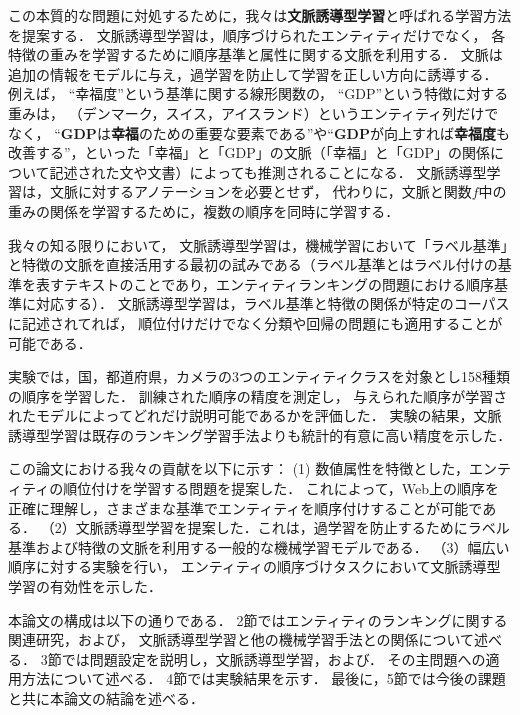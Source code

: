 この本質的な問題に対処するために，我々は{\bf 文脈誘導型学習}と呼ばれる学習方法を提案する．
文脈誘導型学習は，順序づけられたエンティティだけでなく，
各特徴の重みを学習するために順序基準と属性に関する文脈を利用する．
文脈は追加の情報をモデルに与え，過学習を防止して学習を正しい方向に誘導する．
例えば， ``幸福度''という基準に関する線形関数の， ``GDP''という特徴に対する重みは，
（デンマーク，スイス，アイスランド）というエンティティ列だけでなく，
 ``{\bf GDP}は{\bf 幸福}のための重要な要素である''や``{\bf GDP}が向上すれば{\bf 幸福度}も改善する''，といった「幸福」と「GDP」の文脈（「幸福」と「GDP」の関係について記述された文や文書）によっても推測されることになる．
文脈誘導型学習は，文脈に対するアノテーションを必要とせず， 
代わりに，文脈と関数$f$中の重みの関係を学習するために，複数の順序を同時に学習する．
 
我々の知る限りにおいて，
文脈誘導型学習は，機械学習において「ラベル基準」と特徴の文脈を直接活用する最初の試みである（ラベル基準とはラベル付けの基準を表すテキストのことであり，エンティティランキングの問題における順序基準に対応する）．
文脈誘導型学習は，ラベル基準と特徴の関係が特定のコーパスに記述されてれば，
順位付けだけでなく分類や回帰の問題にも適用することが可能である．

実験では，国，都道府県，カメラの3つのエンティティクラスを対象とし158種類の順序を学習した．
訓練された順序の精度を測定し，
与えられた順序が学習されたモデルによってどれだけ説明可能であるかを評価した．
実験の結果，文脈誘導型学習は既存のランキング学習手法よりも統計的有意に高い精度を示した．

この論文における我々の貢献を以下に示す：
(1) 数値属性を特徴とした，エンティティの順位付けを学習する問題を提案した．
これによって，Web上の順序を正確に理解し，さまざまな基準でエンティティを順序付けすることが可能である．
（2）文脈誘導型学習を提案した．これは，過学習を防止するためにラベル基準および特徴の文脈を利用する一般的な機械学習モデルである．
（3）幅広い順序に対する実験を行い，
エンティティの順序づけタスクにおいて文脈誘導型学習の有効性を示した．

本論文の構成は以下の通りである．
2節ではエンティティのランキングに関する関連研究，および，
文脈誘導型学習と他の機械学習手法との関係について述べる．
3節では問題設定を説明し，文脈誘導型学習，および．
その主問題への適用方法について述べる．
4節では実験結果を示す．
最後に，5節では今後の課題と共に本論文の結論を述べる．